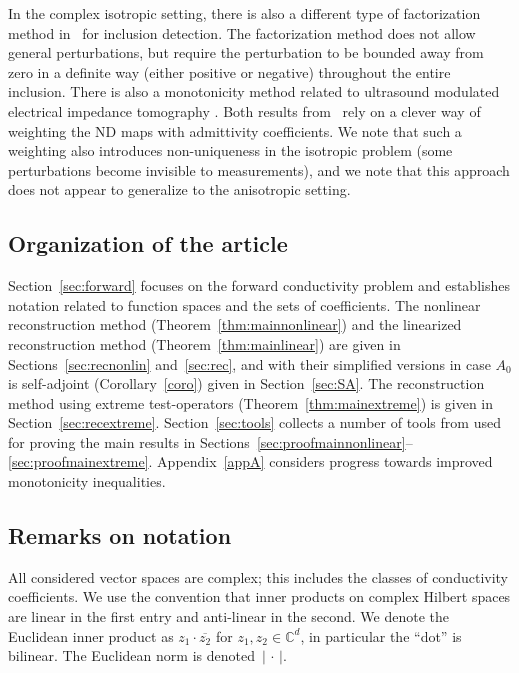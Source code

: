 \documentclass[reqno]{amsart}
\numberwithin{equation}{section}
\numberwithin{figure}{section}
\numberwithin{table}{section}
\theoremstyle{plain}
\theoremstyle{definition}
\theoremstyle{remark}
\newcommand{\abs}[1]{\lvert#1\rvert}
\newcommand{\C}{\mathbb{C}}
\begin{document}
	In the complex isotropic setting, there is also a different type of factorization method in~\cite{Harrach09} for inclusion detection. The factorization method does not allow general perturbations, but require the perturbation to be bounded away from zero in a definite way (either positive or negative) throughout the entire inclusion. There is also a monotonicity method related to ultrasound modulated electrical impedance tomography \cite{Harrach2015}. Both results from~\cite{Harrach09,Harrach2015} rely on a clever way of weighting the ND maps with admittivity coefficients. We note that such a weighting also introduces non-uniqueness in the isotropic problem (some perturbations become invisible to measurements), and we note that this approach does not appear to generalize to the anisotropic setting.
	
	\subsection{Organization of the article}
	
	Section~\ref{sec:forward} focuses on the forward conductivity problem and establishes notation related to function spaces and the sets of coefficients. The nonlinear reconstruction method (Theorem~\ref{thm:mainnonlinear}) and the linearized reconstruction method (Theorem~\ref{thm:mainlinear}) are given in Sections~\ref{sec:recnonlin} and~\ref{sec:rec}, and with their simplified versions in case $A_0$ is self-adjoint (Corollary~\ref{coro}) given in Section~\ref{sec:SA}. The reconstruction method using extreme test-operators (Theorem~\ref{thm:mainextreme}) is given in Section~\ref{sec:recextreme}. Section~\ref{sec:tools} collects a number of tools from \cite{GJZ2025} used for proving the main results in Sections~\ref{sec:proofmainnonlinear}--\ref{sec:proofmainextreme}. Appendix~\ref{appA} considers progress towards improved monotonicity inequalities.
	
	\subsection{Remarks on notation} \label{sec:notation}
	
	All considered vector spaces are complex; this includes the classes of conductivity coefficients. We use the convention that inner products on complex Hilbert spaces are linear in the first entry and anti-linear in the second. We denote the Euclidean inner product as $z_1\cdot\overline{z_2}$ for $z_1,z_2\in \C^d$, in particular the ``dot'' is bilinear. The Euclidean norm is denoted~$\abs{\,\cdot\,}$.
	
\end{document}
